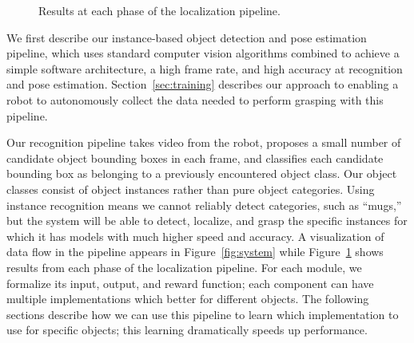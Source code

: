 \documentclass[graybox]{svmult}
\begin{document}
\begin{figure}
%
%
%
%

\caption{Results at each phase of the localization pipeline.\label{fig:images}}
\end{figure}

We first describe our instance-based object detection and pose
estimation pipeline, which uses standard computer vision algorithms
combined to achieve a simple software architecture, a high frame rate,
and high accuracy at recognition and pose
estimation.  Section~\ref{sec:training} describes our
approach to enabling a robot to autonomously collect the data needed
to perform grasping with this pipeline.

Our recognition pipeline takes video from the robot, proposes a small
number of candidate object bounding boxes in each frame, and
classifies each candidate bounding box as belonging to a previously
encountered object class. Our object classes consist of object
instances rather than pure object categories.  Using instance
recognition means we cannot reliably detect categories, such as
``mugs,'' but the system will be able to detect, localize, and grasp
the specific instances for which it has models with much higher speed
and accuracy.  A visualization of data flow in the pipeline appears in
Figure~\ref{fig:system} while Figure~\ref{fig:images} shows results
from each phase of the localization pipeline.  For each module, we
formalize its input, output, and reward function; each component can
have multiple implementations which better for different objects.  The
following sections describe how we can use this pipeline to learn
which implementation to use for specific objects; this learning
dramatically speeds up performance.
\end{document}
